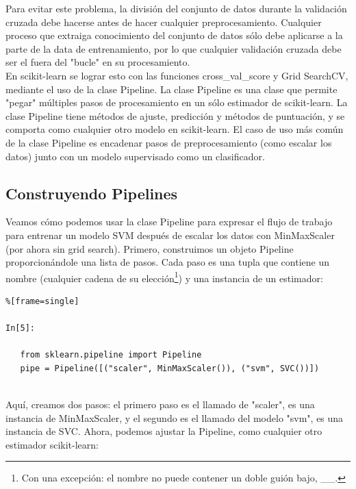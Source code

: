    
   Para evitar este problema, la división del conjunto de datos durante la validación cruzada debe hacerse antes de hacer cualquier preprocesamiento. Cualquier proceso que extraiga conocimiento del conjunto de datos sólo debe aplicarse a la parte de la data de entrenamiento, por lo que cualquier validación cruzada debe ser el fuera del "{}bucle"{} en su procesamiento.\\

   En {\ttfamily scikit-learn} se lograr esto  con las funciones {\ttfamily cross\_val\_score} y    {\ttfamily Grid SearchCV}, mediante el uso de la clase {\ttfamily  Pipeline}. La clase {\ttfamily  Pipeline} es una clase que permite "{}pegar"{}  múltiples pasos de procesamiento en un sólo estimador de {\ttfamily scikit-learn}.
   La clase Pipeline tiene métodos de ajuste, predicción y métodos de  puntuación,  y se comporta como cualquier otro modelo en {\ttfamily scikit-learn}. El caso de uso más común de la clase {\ttfamily  Pipeline} es encadenar pasos de preprocesamiento (como escalar los datos) junto con un modelo supervisado como un clasificador.
   

   
   \subsection{Construyendo  Pipelines}
   
   Veamos cómo podemos usar la clase {\ttfamily  Pipeline} para expresar el flujo de trabajo para entrenar un modelo SVM después de escalar los datos con {\ttfamily MinMaxScaler} (por ahora sin  grid search). Primero, construimos un objeto  {\ttfamily  Pipeline} proporcionándole una lista de pasos. Cada paso es una tupla que contiene un nombre (cualquier cadena de su elección\footnote{Con una excepción: el nombre no puede contener un doble guión bajo, \_\_.}) y una instancia de un estimador:
   
   
\begin{lstlisting}%[frame=single]
   
In[5]:
   
   from sklearn.pipeline import Pipeline
   pipe = Pipeline([("scaler", MinMaxScaler()), ("svm", SVC())])
   
\end{lstlisting}
   

   Aquí, creamos dos pasos: el primero paso es el  llamado  de  "{}scaler"{}, es una instancia de {\ttfamily  MinMaxScaler}, y el segundo es  el llamado del modelo  "{}svm"{}, es una instancia de SVC. Ahora, podemos ajustar la {\ttfamily  Pipeline}, como cualquier otro estimador {\ttfamily scikit-learn}:
   
